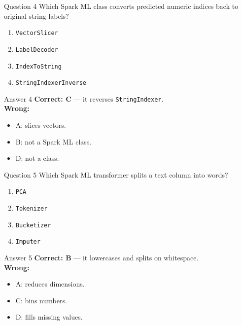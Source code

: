 \documentclass[aspectratio=169,11pt]{beamer}
\begin{document}
\begin{frame}{Question 4}
Which Spark ML class converts predicted numeric indices back to original string labels?
\begin{enumerate}[label=\Alph*.]
\item \texttt{VectorSlicer}
\item \texttt{LabelDecoder}
\item \texttt{IndexToString}
\item \texttt{StringIndexerInverse}
\end{enumerate}
\end{frame}
\begin{frame}{Answer 4}
\textbf{Correct: C} --- it reverses \texttt{StringIndexer}.\\
\vspace{0.5em}
\textbf{Wrong:}
\begin{itemize}
\item A: slices vectors.
\item B: not a Spark ML class.
\item D: not a class.
\end{itemize}
\end{frame}

\begin{frame}{Question 5}
Which Spark ML transformer splits a text column into words?
\begin{enumerate}[label=\Alph*.]
\item \texttt{PCA}
\item \texttt{Tokenizer}
\item \texttt{Bucketizer}
\item \texttt{Imputer}
\end{enumerate}
\end{frame}
\begin{frame}{Answer 5}
\textbf{Correct: B} --- it lowercases and splits on whitespace.\\
\vspace{0.5em}
\textbf{Wrong:}
\begin{itemize}
\item A: reduces dimensions.
\item C: bins numbers.
\item D: fills missing values.
\end{itemize}
\end{frame}
\end{document}
